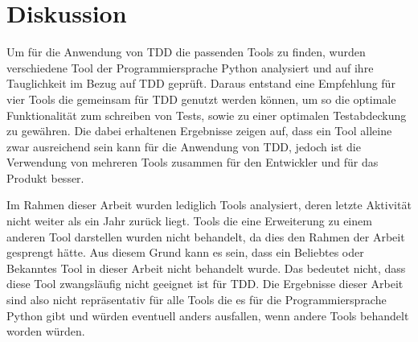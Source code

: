 \section{Diskussion}\label{diskussion}
Um für die Anwendung von TDD die passenden Tools zu finden, wurden verschiedene
Tool der Programmiersprache Python analysiert und auf ihre Tauglichkeit im
Bezug auf TDD geprüft. Daraus entstand eine Empfehlung für vier Tools die
gemeinsam für TDD genutzt werden können, um so die optimale Funktionalität zum
schreiben von Tests, sowie zu einer optimalen Testabdeckung zu gewähren. Die 
dabei erhaltenen Ergebnisse zeigen auf, dass ein Tool alleine zwar ausreichend 
sein kann für die Anwendung von TDD, jedoch ist die Verwendung von mehreren 
Tools zusammen für den Entwickler und für das Produkt besser.

Im Rahmen dieser Arbeit wurden lediglich Tools analysiert, deren letzte
Aktivität nicht weiter als ein Jahr zurück liegt. Tools die eine Erweiterung zu
einem anderen Tool darstellen wurden nicht behandelt, da dies den Rahmen der
Arbeit gesprengt hätte. Aus diesem Grund kann es sein, dass ein Beliebtes oder
Bekanntes Tool in dieser Arbeit nicht behandelt wurde. Das bedeutet nicht, dass
diese Tool zwangsläufig nicht geeignet ist für TDD. Die Ergebnisse dieser
Arbeit sind also nicht repräsentativ für alle Tools die es für die
Programmiersprache Python gibt und würden eventuell anders ausfallen, wenn
andere Tools behandelt worden würden.

%
%
%
%
